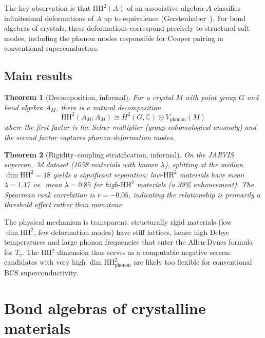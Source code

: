 \documentclass[12pt,a4paper]{article}
\newtheorem{theorem}{Theorem}[section]
\newcommand{\HH}{\mathrm{HH}}
\newcommand{\CC}{\mathbb{C}}
\begin{document}
The key observation is that $\HH^2(A)$ of an associative algebra $A$
classifies infinitesimal deformations of $A$ up to equivalence
(Gerstenhaber~\cite{gerstenhaber1963}). For bond algebras of crystals,
these deformations correspond precisely to structural soft modes,
including the phonon modes responsible for Cooper pairing in
conventional superconductors.

\subsection{Main results}

\begin{theorem}[Decomposition, informal]
\label{thm:decomp-informal}
For a crystal $M$ with point group $G$ and bond algebra $A_M$,
there is a natural decomposition
\[
  \HH^2(A_M, A_M) \cong H^2(G, \CC) \oplus V_{\mathrm{phonon}}(M)
\]
where the first factor is the Schur multiplier (group-cohomological
anomaly) and the second factor captures phonon-deformation modes.
\end{theorem}

\begin{theorem}[Rigidity--coupling stratification, informal]
\label{thm:predictive-informal}
On the JARVIS supercon\_3d dataset (1058 materials with known
$\lambda$), splitting at the median $\dim\HH^2 = 18$ yields a
significant separation: low-$\HH^2$ materials have mean $\lambda =
1.17$ vs.\ mean $\lambda = 0.85$ for high-$\HH^2$ materials (a
39\% enhancement). The Spearman rank correlation is $r = -0.05$,
indicating the relationship is primarily a threshold effect rather
than monotone.
\end{theorem}

The physical mechanism is transparent: structurally rigid materials
(low $\dim\HH^2$, few deformation modes) have stiff lattices,
hence high Debye temperatures and large phonon frequencies that
enter the Allen-Dynes formula for $T_c$. The HH$^2$ dimension
thus serves as a computable negative screen: candidates with very
high $\dim\HH^2_{\mathrm{phonon}}$ are likely too flexible for
conventional BCS superconductivity.

\section{Bond algebras of crystalline materials}
\label{sec:bond-algebra}
\end{document}
